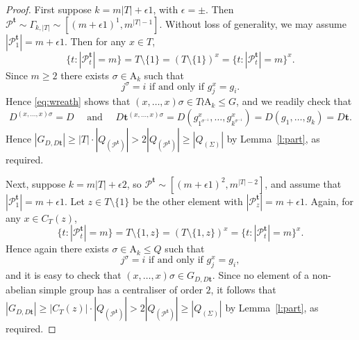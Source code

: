 \documentclass[10pt,a4paper]{amsart}
\newcommand{\An}{\mathrm{A}}
\def\ge{\geqs}
\newcommand{\geqs}{\geqslant}
\def\le{\leqs}
\newcommand{\leqs}{\leqslant}
\newcommand{\minPart}{\Gamma_{k, |T|}}
\begin{document}
\begin{proof}
    First suppose  $k = m|T| +  \epsilon 1$, with $\epsilon = \pm$. Then $\mathcal{P}^{\mathbf{t}}\sim \minPart \sim [(m + \epsilon 1)^1,m^{|T|-1}]$. Without loss of generality, we may assume $|\mathcal{P}_1^{\mathbf{t}}| = m + \epsilon 1$. Then for any $x\in T$,
	\begin{equation*}
	\{t:|\mathcal{P}_t^{\mathbf{t}}| = m\} = T\setminus\{1\} = (T\setminus\{1\})^{x} = \{t:|\mathcal{P}_t^{\mathbf{t}}| = m\}^{x}.
	\end{equation*}
	Since $m \ge 2$ there exists $\sigma\in \An_k$ such that
	\begin{equation*}
	j^\sigma = i\mbox{ if and only if }g_j^{x} = g_i.
	\end{equation*}
	Hence \eqref{eq:wreath} shows that $(x,\dots,x)\sigma\in T \wr \An_k \leqs G$, and  we readily check that
	\begin{equation*}
	D^{(x, \ldots, x)\sigma} = D \quad \mbox{ and } \quad  D\mathbf{t}^{(x,\dots,x)\sigma} = D(g_{1^{\sigma^{-1}}}^{x},\dots,g_{k^{\sigma^{-1}}}^{x}) = D(g_1,\dots,g_k) = D\mathbf{t}.
	\end{equation*}
	Hence $|G_{D,D\mathbf{t}}| \geqs |T|\cdot |Q_{(\mathcal{P}^{\mathbf{t}})}| > 2|Q_{(\mathcal{P}^{\mathbf{t}})}| \geqs |Q_{(\Sigma)}|$ by Lemma~\ref{l:part}, as required. 
	
	Next, suppose $k = m|T| + \epsilon 2$, so $\mathcal{P}^{\mathbf{t}}\sim [(m + \epsilon 1 )^2,m^{|T|-2}]$, and assume that $|\mathcal{P}_1^{\mathbf{t}}| = m + \epsilon 1$. Let $z\in T\setminus\{1\}$ be the other element with $|\mathcal{P}_z^{\mathbf{t}}| = m + \epsilon 1$. Again, for any $x\in C_T(z)$,
	\begin{equation*}
	\{t:|\mathcal{P}_t^{\mathbf{t}}| = m\} = T\setminus\{1,z\} = (T\setminus\{1,z\})^{x} = \{t:|\mathcal{P}_t^{\mathbf{t}}| = m\}^{x}.
	\end{equation*}
	Hence again there exists $\sigma\in \An_k \le Q$ such that
	\begin{equation*}
	j^\sigma = i\mbox{ if and only if }g_j^{x} = g_i,
	\end{equation*}
	and it is easy to check that $(x,\dots,x)\sigma\in G_{D,D\mathbf{t}}$. Since no element of a non-abelian simple group has a  centraliser of order $2$,  
    it follows that $|G_{D,D\mathbf{t}}|\geqs |C_T(z)|\cdot |Q_{(\mathcal{P}^{\mathbf{t}})}| > 2|Q_{(\mathcal{P}^{\mathbf{t}})}| \geqs |Q_{(\Sigma)}|$ by Lemma~\ref{l:part}, as required.
	

\end{proof}
\end{document}
